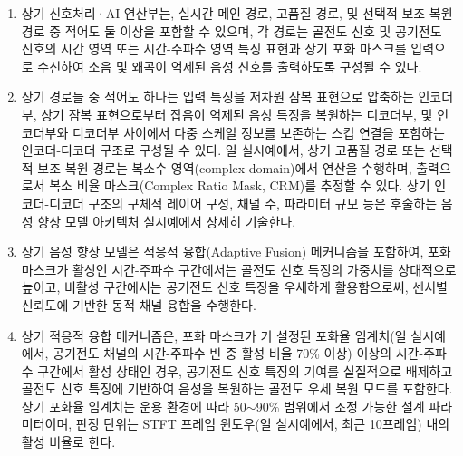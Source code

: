 \documentclass{article}
\begin{document}
\begin{enumerate}[label = \textbf{(B.2.\arabic*)}]

    \item 상기 신호처리·AI 연산부는, 실시간 메인 경로, 고품질 경로, 및 선택적 보조 복원 경로 중 적어도 둘 이상을 포함할 수 있으며, 각 경로는 골전도 신호 및 공기전도 신호의 시간 영역 또는 시간-주파수 영역 특징 표현과 상기 포화 마스크를 입력으로 수신하여 소음 및 왜곡이 억제된 음성 신호를 출력하도록 구성될 수 있다.

    \item 상기 경로들 중 적어도 하나는 입력 특징을 저차원 잠복 표현으로
    압축하는 인코더부, 상기 잠복 표현으로부터 잡음이 억제된 음성 특징을
    복원하는 디코더부, 및 인코더부와 디코더부 사이에서 다중 스케일
    정보를 보존하는 스킵 연결을 포함하는 인코더-디코더 구조로 구성될 수 있다. 일 실시예에서, 상기 고품질 경로 또는 선택적 보조 복원 경로는 복소수 영역(complex domain)에서 연산을 수행하며, 출력으로서 복소 비율 마스크(Complex Ratio Mask, CRM)를 추정할 수 있다. 상기 인코더-디코더 구조의 구체적 레이어 구성, 채널 수, 파라미터 규모 등은 후술하는 음성 향상 모델 아키텍처 실시예에서 상세히 기술한다.

    \item 상기 음성 향상 모델은 적응적 융합(Adaptive Fusion) 메커니즘을
    포함하여, 포화 마스크가 활성인 시간-주파수 구간에서는 골전도 신호
    특징의 가중치를 상대적으로 높이고, 비활성 구간에서는 공기전도 신호
    특징을 우세하게 활용함으로써, 센서별 신뢰도에 기반한 동적 채널
    융합을 수행한다.

    \item 상기 적응적 융합 메커니즘은, 포화 마스크가 
    기 설정된 포화율 임계치(일 실시예에서, 공기전도 채널의 시간-주파수 빈 중 활성 비율 70\% 이상) 이상의 시간-주파수 구간에서 활성 상태인 
    경우, 공기전도 신호 특징의 기여를 실질적으로 
    배제하고 골전도 신호 특징에 기반하여 음성을 
    복원하는 골전도 우세 복원 모드를 포함한다. 상기 포화율 임계치는 운용 환경에 따라 50$\sim$90\% 범위에서 조정 가능한 설계 파라미터이며, 판정 단위는 STFT 프레임 윈도우(일 실시예에서, 최근 10프레임) 내의 활성 비율로 한다.


\end{enumerate}
\end{document}
